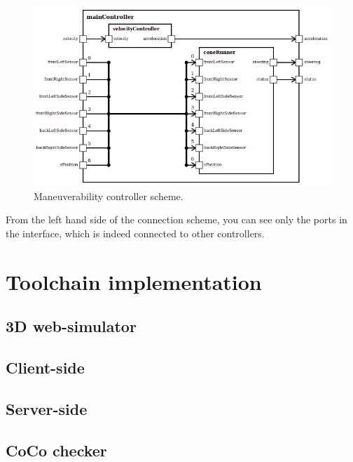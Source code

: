 \begin{figure}[ht]
    \centering
    \includegraphics[width=\linewidth]{src/pic/controller04}
    \caption{Maneuverability controller scheme.}
    \label{fig:maneuverability-scheme}
\end{figure}
From the left hand side of the connection scheme, you can see only the ports in the interface, which is indeed connected to other controllers.
\chapter{Toolchain implementation}
\section{3D web-simulator}
\section{Client-side}
\section{Server-side}
\section{CoCo checker}
